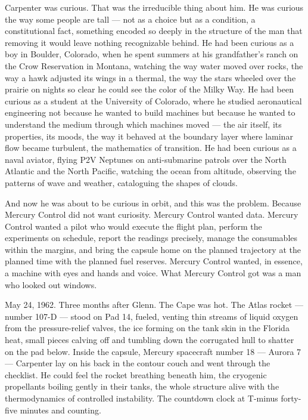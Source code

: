 \documentclass[12pt, letterpaper]{article}
\begin{document}
Carpenter was curious. That was the irreducible thing about him. He was curious the way some people are tall --- not as a choice but as a condition, a constitutional fact, something encoded so deeply in the structure of the man that removing it would leave nothing recognizable behind. He had been curious as a boy in Boulder, Colorado, when he spent summers at his grandfather's ranch on the Crow Reservation in Montana, watching the way water moved over rocks, the way a hawk adjusted its wings in a thermal, the way the stars wheeled over the prairie on nights so clear he could see the color of the Milky Way. He had been curious as a student at the University of Colorado, where he studied aeronautical engineering not because he wanted to build machines but because he wanted to understand the medium through which machines moved --- the air itself, its properties, its moods, the way it behaved at the boundary layer where laminar flow became turbulent, the mathematics of transition. He had been curious as a naval aviator, flying P2V Neptunes on anti-submarine patrols over the North Atlantic and the North Pacific, watching the ocean from altitude, observing the patterns of wave and weather, cataloguing the shapes of clouds.

And now he was about to be curious in orbit, and this was the problem. Because Mercury Control did not want curiosity. Mercury Control wanted data. Mercury Control wanted a pilot who would execute the flight plan, perform the experiments on schedule, report the readings precisely, manage the consumables within the margins, and bring the capsule home on the planned trajectory at the planned time with the planned fuel reserves. Mercury Control wanted, in essence, a machine with eyes and hands and voice. What Mercury Control got was a man who looked out windows.

May 24, 1962. Three months after Glenn. The Cape was hot. The Atlas rocket --- number 107-D --- stood on Pad 14, fueled, venting thin streams of liquid oxygen from the pressure-relief valves, the ice forming on the tank skin in the Florida heat, small pieces calving off and tumbling down the corrugated hull to shatter on the pad below. Inside the capsule, Mercury spacecraft number 18 --- Aurora 7 --- Carpenter lay on his back in the contour couch and went through the checklist. He could feel the rocket breathing beneath him, the cryogenic propellants boiling gently in their tanks, the whole structure alive with the thermodynamics of controlled instability. The countdown clock at T-minus forty-five minutes and counting.
\end{document}
